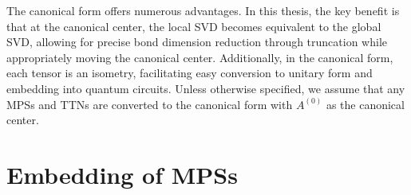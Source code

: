 \documentclass[12pt,dvipdfmx,twoside,openright]{report}
\begin{document}
The canonical form offers numerous advantages.
In this thesis, the key benefit is that at the canonical center, the local SVD becomes equivalent to the global SVD, allowing for precise bond dimension reduction through truncation while appropriately moving the canonical center.
Additionally, in the canonical form, each tensor is an isometry, facilitating easy conversion to unitary form and embedding into quantum circuits. 
Unless otherwise specified, we assume that any MPSs and TTNs are converted to the canonical form with $A^{(0)}$ as the canonical center.

\section{Embedding of MPSs}
\end{document}
